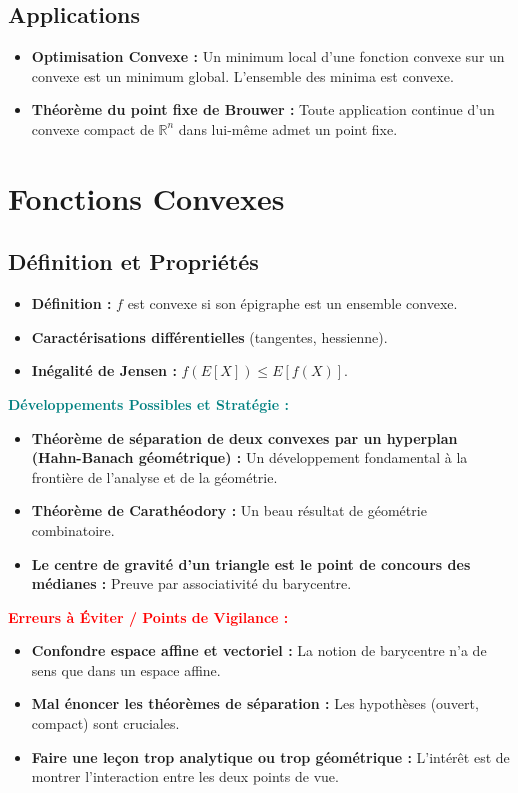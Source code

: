 \documentclass[12pt, a4paper, parskip=full]{report}
\theoremstyle{agregstyle}
\newenvironment{developpements}
  {\par\medskip\noindent\begin{oframed}\noindent\textbf{\textcolor{teal}{Développements Possibles et Stratégie :}}}
  {\end{oframed}\par\medskip}
\newenvironment{erreurs}
  {\par\medskip\noindent\begin{oframed}\noindent\textbf{\textcolor{red}{Erreurs à Éviter / Points de Vigilance :}}}
  {\end{oframed}\par\medskip}
\begin{document}
\subsection{Applications}
\begin{itemize}
    \item \textbf{Optimisation Convexe :} Un minimum local d'une fonction convexe sur un convexe est un minimum global. L'ensemble des minima est convexe.
    \item \textbf{Théorème du point fixe de Brouwer :} Toute application continue d'un convexe compact de $\mathbb{R}^n$ dans lui-même admet un point fixe.
\end{itemize}

\section{Fonctions Convexes}
\subsection{Définition et Propriétés}
\begin{itemize}
    \item \textbf{Définition :} $f$ est convexe si son épigraphe est un ensemble convexe.
    \item \textbf{Caractérisations différentielles} (tangentes, hessienne).
    \item \textbf{Inégalité de Jensen :} $f(E[X]) \le E[f(X)]$.
\end{itemize}

\begin{developpements}
    \begin{itemize}
        \item \textbf{Théorème de séparation de deux convexes par un hyperplan (Hahn-Banach géométrique) :} Un développement fondamental à la frontière de l'analyse et de la géométrie.
        \item \textbf{Théorème de Carathéodory :} Un beau résultat de géométrie combinatoire.
        \item \textbf{Le centre de gravité d'un triangle est le point de concours des médianes :} Preuve par associativité du barycentre.
    \end{itemize}
\end{developpements}

\begin{erreurs}
    \begin{itemize}
        \item \textbf{Confondre espace affine et vectoriel :} La notion de barycentre n'a de sens que dans un espace affine.
        \item \textbf{Mal énoncer les théorèmes de séparation :} Les hypothèses (ouvert, compact) sont cruciales.
        \item \textbf{Faire une leçon trop analytique ou trop géométrique :} L'intérêt est de montrer l'interaction entre les deux points de vue.
    \end{itemize}
\end{erreurs}
\end{document}
